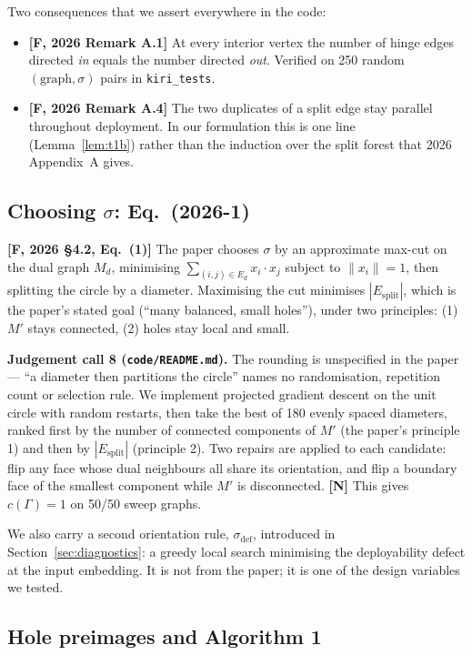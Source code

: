 \documentclass[11pt,a4paper]{article}
\theoremstyle{definition}
\newcommand{\Esplit}{E_{\mathrm{split}}}
\newcommand{\Mprime}{M'}
\newcommand{\file}[1]{\texttt{\small #1}}
\begin{document}
Two consequences that we assert everywhere in the code:
\begin{itemize}\itemsep2pt
\item \textbf{[F, 2026 Remark A.1]} At every interior vertex the number of hinge edges
directed \emph{in} equals the number directed \emph{out}. Verified on 250 random
$(\text{graph},\sigma)$ pairs in \file{kiri\_tests}.
\item \textbf{[F, 2026 Remark A.4]} The two duplicates of a split edge stay parallel
throughout deployment. In our formulation this is one line (Lemma~\ref{lem:t1b}) rather
than the induction over the split forest that 2026 Appendix~A gives.
\end{itemize}

\subsection{Choosing \texorpdfstring{$\sigma$}{sigma}: Eq.~(2026-1)}

\textbf{[F, 2026 §4.2, Eq.~(1)]} The paper chooses $\sigma$ by an approximate max-cut on the
dual graph $M_d$, minimising $\sum_{(i,j)\in E_d} x_i\!\cdot\!x_j$ subject to $\|x_i\|=1$,
then splitting the circle by a diameter. Maximising the cut minimises $|\Esplit|$, which is
the paper's stated goal (``many balanced, small holes''), under two principles: (1) $\Mprime$
stays connected, (2) holes stay local and small.

\textbf{Judgement call 8 (\file{code/README.md}).} The rounding is unspecified in the paper
--- ``a diameter then partitions the circle'' names no randomisation, repetition count or
selection rule. We implement projected gradient descent on the unit circle with random
restarts, then take the best of 180 evenly spaced diameters, ranked first by the number of
connected components of $\Mprime$ (the paper's principle 1) and then by $|\Esplit|$
(principle 2). Two repairs are applied to each candidate: flip any face whose dual
neighbours all share its orientation, and flip a boundary face of the smallest component
while $\Mprime$ is disconnected. \textbf{[N]} This gives $c(\Gamma)=1$ on 50/50 sweep graphs.

We also carry a second orientation rule, $\sigma_{\mathrm{def}}$, introduced in
Section~\ref{sec:diagnostics}: a greedy local search minimising the deployability defect at
the input embedding. It is not from the paper; it is one of the design variables we tested.

\subsection{Hole preimages and Algorithm 1}
\end{document}
